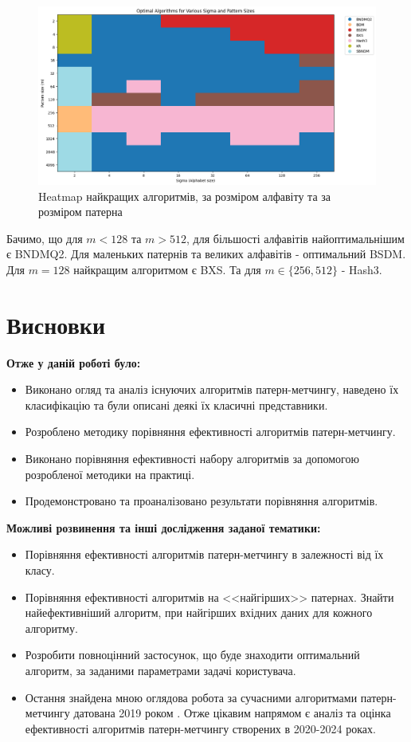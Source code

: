 \documentclass[a4paper,14pt]{extarticle} %
\begin{document}
			\begin{figure}[H]
				\centering
				\includegraphics[width=1\textwidth]{images/sigma_results.png}
				\caption{Heatmap найкращих алгоритмів, за розміром алфавіту та за розміром патерна}
				\label{fig:sigma_results}
			\end{figure}

			Бачимо, що для $m<128$ та $m>512$, для більшості алфавітів найоптимальнішим є BNDMQ2. Для маленьких патернів та великих алфавітів - оптимальний BSDM.
			Для $m=128$ найкращим алгоритмом є BXS. Та для $m\in \{256,512\}$ - Hash3.
	\newpage
    \section*{Висновки}
	\textbf{Отже у даній роботі було:}
	\begin{itemize}
		\item Виконано огляд та аналіз існуючих алгоритмів патерн-метчингу, наведено їх класифікацію та були описані деякі їх класичні представники.
		\item Розроблено методику порівняння ефективності алгоритмів патерн-метчингу.
		\item Виконано порівняння ефективності набору алгоритмів за допомогою розробленої методики на практиці.
		\item Продемонстровано та проаналізовано результати порівняння алгоритмів.
	\end{itemize}

	\textbf{Можливі розвинення та інші дослідження заданої тематики:}
	\begin{itemize}
		\item Порівняння ефективності алгоритмів патерн-метчингу в залежності від їх класу.
		\item Порівняння ефективності алгоритмів на <<найгірших>> патернах. Знайти найефективніший алгоритм, при найгірших вхідних даних для кожного алгоритму.
		\item Розробити повноцінний застосунок, що буде знаходити оптимальний алгоритм, за заданими параметрами задачі користувача.
		\item Остання знайдена мною оглядова робота за сучасними алгоритмами патерн-метчингу датована 2019 роком \cite{2019survey}. Отже цікавим напрямом є аналіз та оцінка ефективності алгоритмів патерн-метчингу створених в 2020-2024 роках.
	\end{itemize}
\end{document}
